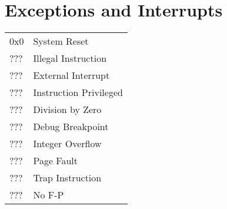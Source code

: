\chapter{Exceptions and Interrupts}

\begin{tabular}{ |p{3cm}|p{4cm}|  }
    \hline
    0x0 & System Reset \\
    ??? & Illegal Instruction \\
    ??? & External Interrupt \\
    ??? & Instruction Privileged \\
    ??? & Division by Zero \\
    ??? & Debug Breakpoint \\
    ??? & Integer Overflow \\
    ??? & Page Fault \\
    ??? & Trap Instruction \\
    ??? & No F-P \\
    \hline
\end{tabular}
